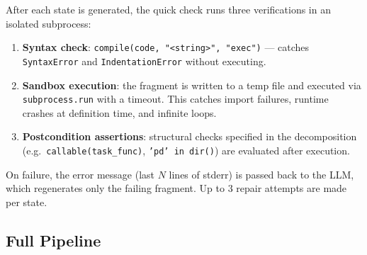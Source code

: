 \documentclass[11pt,twocolumn]{article}
\begin{document}
After each state is generated, the quick check runs three verifications in an
isolated subprocess:

\begin{enumerate}[leftmargin=1.5em, itemsep=1pt]
  \item \textbf{Syntax check}: \texttt{compile(code, "<string>", "exec")} ---
        catches \texttt{SyntaxError} and \texttt{IndentationError} without
        executing.
  \item \textbf{Sandbox execution}: the fragment is written to a temp file and
        executed via \texttt{subprocess.run} with a timeout. This catches
        import failures, runtime crashes at definition time, and infinite loops.
  \item \textbf{Postcondition assertions}: structural checks specified in the
        decomposition (e.g.\ \texttt{callable(task\_func)},
        \texttt{'pd' in dir()}) are evaluated after execution.
\end{enumerate}

On failure, the error message (last $N$ lines of stderr) is passed back to the
LLM, which regenerates only the failing fragment. Up to 3 repair attempts are
made per state.

\subsection{Full Pipeline}
\end{document}
